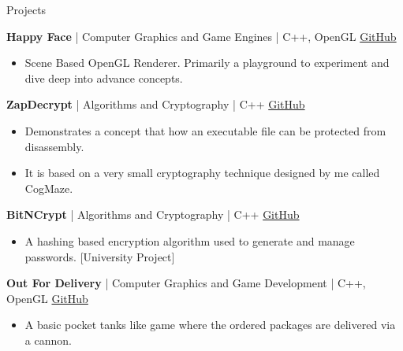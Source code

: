 \documentclass{resume}
\begin{document}
\begin{rSection}{Projects}
\vspace{-1em}

\item \textbf{Happy Face} | {Computer Graphics and Game Engines} | {C++, OpenGL} \hfill \href{https://github.com/JayNakum/HappyFace}{GitHub}
\begin{itemize}
    \item Scene Based OpenGL Renderer. Primarily a playground to experiment and dive deep into advance concepts.
 \end{itemize}

 \item \textbf{ZapDecrypt} | {Algorithms and Cryptography} | {C++} \hfill \href{https://github.com/JayNakum/ZapDecrypt}{GitHub}
\begin{itemize}
    \item Demonstrates a concept that how an executable file can be protected from disassembly. 
    \item It is based on a very small cryptography technique designed by me called CogMaze.
 \end{itemize}

 \item \textbf{BitNCrypt} | {Algorithms and Cryptography} | {C++} \hfill \href{https://github.com/JayNakum/BitNCrypt}{GitHub}
\begin{itemize}
    \item A hashing based encryption algorithm used to generate and manage passwords. [University Project]
 \end{itemize}

\item \textbf{Out For Delivery} | {Computer Graphics and Game Development} | {C++, OpenGL} \hfill \href{https://github.com/JayNakum/OutForDelivery}{GitHub}
\begin{itemize}
    \item A basic pocket tanks like game where the ordered packages are delivered via a cannon.
 \end{itemize}



\end{rSection}
\end{document}
